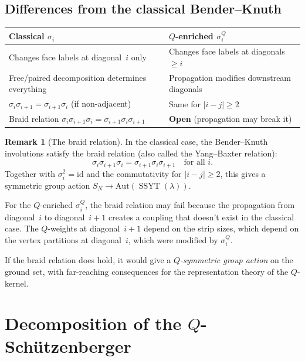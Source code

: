 \documentclass[11pt]{article}
\newcommand{\SSYT}{\operatorname{SSYT}}
\theoremstyle{plain}
\theoremstyle{definition}
\newtheorem{remark}[theorem]{Remark}
\begin{document}
\subsection{Differences from the classical Bender--Knuth}

\begin{center}
\begin{tabular}{l|l}
\textbf{Classical $\sigma_i$} &
  \textbf{$Q$-enriched $\sigma_i^Q$} \\ \hline
Changes face labels at diagonal~$i$ only &
  Changes face labels at diagonals $\geq i$ \\
Free/paired decomposition determines everything &
  Propagation modifies downstream diagonals \\
$\sigma_i \sigma_{i+1} = \sigma_{i+1} \sigma_i$
  (if non-adjacent) &
  Same for $|i-j| \geq 2$ \\
Braid relation
  $\sigma_i \sigma_{i+1} \sigma_i
  = \sigma_{i+1} \sigma_i \sigma_{i+1}$ &
  \textbf{Open} (propagation may break it)
\end{tabular}
\end{center}

\begin{remark}[The braid relation]
\label{rem:braid}
In the classical case, the Bender--Knuth involutions
satisfy the braid relation (also called the Yang--Baxter
relation):
\[
  \sigma_i \sigma_{i+1} \sigma_i
  = \sigma_{i+1} \sigma_i \sigma_{i+1}
  \quad \text{for all } i.
\]
Together with $\sigma_i^2 = \mathrm{id}$ and the commutativity
for $|i-j| \geq 2$, this gives a symmetric group action
$S_N \to \mathrm{Aut}(\SSYT(\lambda))$.

For the $Q$-enriched $\sigma_i^Q$, the braid relation may fail
because the propagation from diagonal~$i$ to diagonal~$i+1$
creates a coupling that doesn't exist in the classical case.
The $Q$-weights at diagonal~$i+1$ depend on the strip sizes,
which depend on the vertex partitions at diagonal~$i$, which
were modified by $\sigma_i^Q$.

If the braid relation does hold, it would give a
\emph{$Q$-symmetric group action} on the ground set, with
far-reaching consequences for the representation theory of
the $Q$-kernel.
\end{remark}


\section{Decomposition of the $Q$-Sch\"utzenberger}
\label{sec:decomposition}
\end{document}
